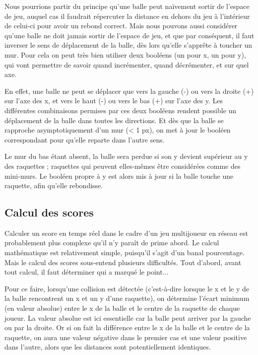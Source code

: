 \documentclass[a4paper,12pt]{article}
\begin{document}
Nous pourrions partir du principe qu'une balle peut naïvement sortir de l'espace de jeu, auquel cas il faudrait répercuter la distance en dehors du jeu à l'intérieur de celui-ci pour avoir un rebond correct. Mais nous pouvons aussi considérer qu'une balle ne doit jamais sortir de l'espace de jeu, et que par conséquent, il faut inverser le sens de déplacement de la balle, dès lors qu'elle s'apprête à toucher un mur. Pour cela on peut très bien utiliser deux booléens (un pour x, un pour y), qui vont permettre de savoir quand incrémenter, quand décrémenter, et sur quel axe.

En effet, une balle ne peut se déplacer que vers la gauche (-) ou vers la droite (+) sur l'axe des x, et vers le haut (-) ou vers le bas (+) sur l'axe des y. Les différentes combinaisons permises par ces deux booléens rendent possible un déplacement de la balle dans toutes les directions. Et dès que la balle se rapproche asymptotiquement d'un mur (\textless{} 1 px), on met à jour le booléen correspondant pour qu'elle reparte dans l'autre sens.

Le mur du bas étant absent, la balle sera perdue si son y devient supérieur au y des raquettes ; raquettes qui peuvent elles-mêmes être considérées comme des mini-murs. Le booléen propre à y est alors mis à jour si la balle touche une raquette, afin qu'elle rebondisse.

\subsection{Calcul des scores}

Calculer un score en temps réel dans le cadre d'un jeu multijoueur en réseau est probablement plus complexe qu'il n'y paraît de prime abord. Le calcul mathématique est relativement simple, puisqu'il s'agit d'un banal pourcentage. Mais le calcul des scores sous-entend plusieurs difficultés. Tout d'abord, avant tout calcul, il faut déterminer qui a marqué le point...

Pour ce faire, lorsqu'une collision est détectée (c'est-à-dire lorsque le x et le y de la balle rencontrent un x et un y d'une raquette), on détermine l'écart minimum (en valeur absolue) entre le x de la balle et le centre de la raquette de chaque joueur. La valeur absolue est ici essentielle car la balle peut arriver par la gauche ou par la droite. Or si on fait la différence entre le x de la balle et le centre de la raquette, on aura une valeur négative dans le premier cas et une valeur positive dans l'autre, alors que les distances sont potentiellement identiques.
\end{document}
